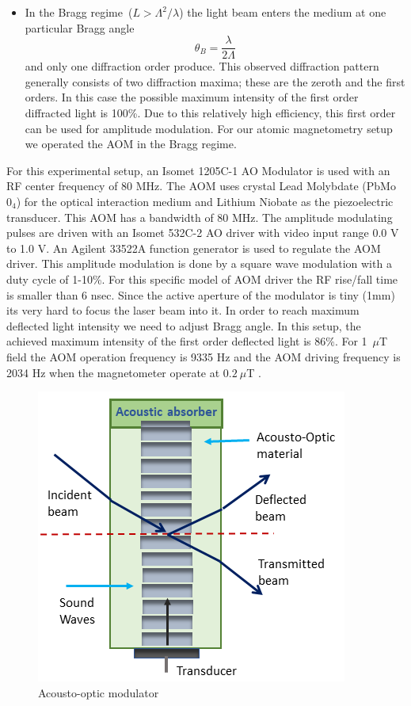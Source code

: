 \begin{itemize}
\item In the Bragg regime~($L > \Lambda^2/\lambda$) the light beam enters the medium at one particular Bragg angle 
\begin{equation}
\theta_B=\frac{\lambda}{2\Lambda}
\end{equation}                                 
and only one diffraction order produce. This observed diffraction pattern generally consists of two diffraction maxima; these are the zeroth and the first orders. In this case the possible maximum intensity of the first order diffracted light is 100\%. Due to this relatively high efficiency, this first order can be used for amplitude modulation. For our atomic magnetometry setup we operated the AOM in the Bragg regime.
\end{itemize}
 For this experimental setup, an Isomet 1205C-1 AO Modulator  is used with an RF center frequency of 80 MHz. The AOM uses crystal Lead Molybdate (PbMo$0_4$) for the optical interaction medium and Lithium Niobate as the piezoelectric transducer. This AOM has a bandwidth of 80 MHz.  The amplitude modulating pulses are driven with an Isomet 532C-2 AO driver with video input range 0.0 V to 1.0 V. An Agilent 33522A function generator is used to regulate the  AOM driver. This amplitude modulation is done by a square wave modulation with a duty cycle of 1-10\%. For this specific model of AOM driver the RF rise/fall time is smaller than 6 nsec. Since the active aperture of the modulator is tiny (1mm) its very hard to focus the laser beam into it. In order to reach maximum deflected light intensity we need to adjust Bragg angle. In this setup, the achieved maximum intensity of the first order deflected light is 86$\%$. For  1~$\mu$T field the AOM operation frequency is 9335 Hz and the AOM driving frequency is 2034 Hz when the magnetometer operate at $0.2~ \mu$T .
\begin{figure}[h]
\centering
\includegraphics[width=0.7\linewidth]{figures/AOM}
\caption{Acousto-optic modulator}
\end{figure}


